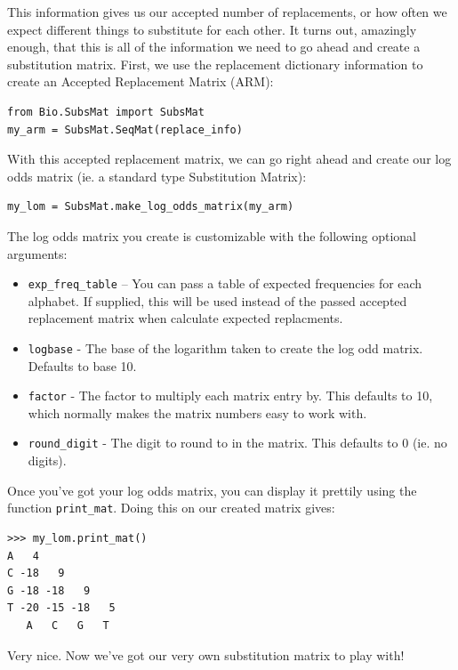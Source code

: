 \documentclass{article}
\begin{document}
This information gives us our accepted number of replacements, or how often we expect different things to substitute for each other. It turns out, amazingly enough, that this is all of the information we need to go ahead and create a substitution matrix. First, we use the replacement dictionary information to create an Accepted Replacement Matrix (ARM):

\begin{verbatim}
from Bio.SubsMat import SubsMat
my_arm = SubsMat.SeqMat(replace_info)
\end{verbatim}

With this accepted replacement matrix, we can go right ahead and create our log odds matrix (ie. a standard type Substitution Matrix):

\begin{verbatim}
my_lom = SubsMat.make_log_odds_matrix(my_arm)
\end{verbatim}

The log odds matrix you create is customizable with the following optional arguments:

\begin{itemize}
  \item \verb|exp_freq_table| -- You can pass a table of expected frequencies for each alphabet. If supplied, this will be used instead of the passed accepted replacement matrix when calculate expected replacments.

  \item \verb|logbase| - The base of the logarithm taken to create the log odd matrix. Defaults to base 10.

  \item \verb|factor| - The factor to multiply each matrix entry by. This defaults to 10, which normally makes the matrix numbers easy to work with.

  \item \verb|round_digit| - The digit to round to in the matrix. This defaults to 0 (ie. no digits).
\end{itemize}

Once you've got your log odds matrix, you can display it prettily using the function \verb|print_mat|. Doing this on our created matrix gives:

\begin{verbatim}
>>> my_lom.print_mat()
A   4
C -18   9
G -18 -18   9
T -20 -15 -18   5
   A   C   G   T
\end{verbatim}

Very nice. Now we've got our very own substitution matrix to play with!
\end{document}
